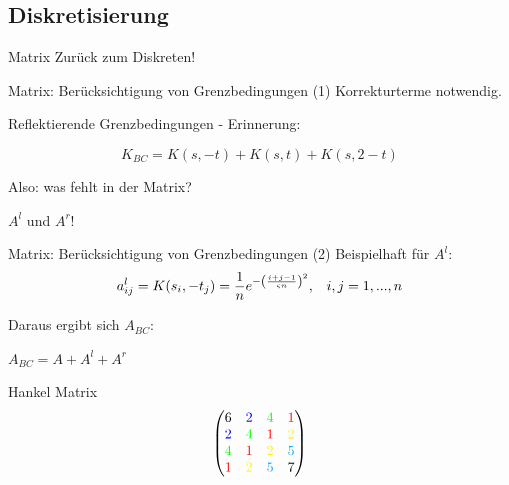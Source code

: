 \documentclass[11pt]{beamer}
\begin{document}
\subsection{Diskretisierung}
\begin{frame}{Matrix}
Zurück zum Diskreten!
\end{frame}


\begin{frame}{Matrix: Berücksichtigung von Grenzbedingungen (1)}
Korrekturterme notwendig.

Reflektierende Grenzbedingungen - Erinnerung:

\[K_{BC} = K(s, -t) + K(s,  t) + K(s, 2-t)\]

Also: was fehlt in der Matrix?
\pause

$A^l$ und $A^r$!
\end{frame}


\begin{frame}{Matrix: Berücksichtigung von Grenzbedingungen (2)}
Beispielhaft für $A^l$:
\[
a^l_{ij} = K(s_i, -t_j) = \frac{1}{n} e^{-\left(i+j-1 \over \varsigma n\right)^2}, \,\,\,\,\, i,j = 1, ..., n
\]

Daraus ergibt sich $A_{BC}$:

\begin{center}
$A_{BC} = A + A^l + A^r$ 
\end{center}
\end{frame}


\begin{frame}{Hankel Matrix}
\[
\begin{pmatrix}
6				   & {\color{blue}   2} & {\color{green}  4} & {\color{red}    1}\\
{\color{blue}   2} & {\color{green}  4} & {\color{red}    1} & {\color{yellow} 2}\\
{\color{green}  4} & {\color{red}    1} & {\color{yellow} 2} & {\color{cyan}  5}\\
{\color{red}    1} & {\color{yellow} 2} & {\color{cyan}   5} & 7\\
\end{pmatrix}
\]
\end{frame}
\end{document}
